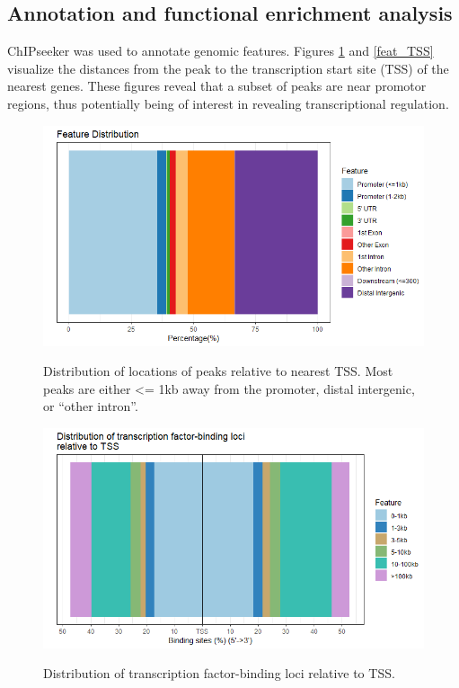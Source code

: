 \documentclass{article}
\begin{document}
{\subsection{Annotation and functional enrichment analysis}
ChIPseeker\cite{yu2015chipseeker} was used to annotate genomic features. Figures \ref{fig:feat_dist} and \ref{feat_TSS} visualize the distances from the peak to the transcription start site (TSS) of the nearest genes. These figures reveal that a subset of peaks are near promotor regions, thus potentially being of interest in revealing transcriptional regulation. 

\begin{figure}[H]
\centering
\includegraphics[width=\textwidth]{feature_distribution.png}
\label{fig:feat_dist}
\caption{Distribution of locations of peaks relative to nearest TSS. Most peaks are either <= 1kb away from the promoter, distal intergenic, or "`other intron"'.}
\end{figure}

\begin{figure}[H]
\centering
\includegraphics[width=\textwidth]{feature_distribution_TSS.png}
\label{fig:feat_TSS}
\caption{Distribution of transcription factor-binding loci relative to TSS.}
\end{figure}

}
\end{document}

